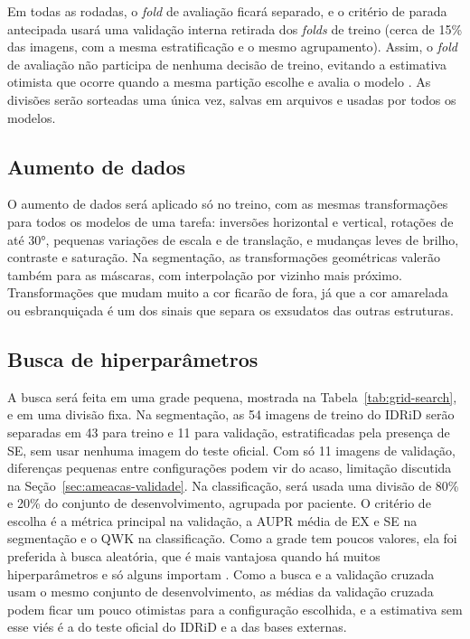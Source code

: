 Em todas as rodadas, o \textit{fold} de avaliação ficará separado, e o critério de parada antecipada usará uma validação interna retirada dos \textit{folds} de treino (cerca de 15\% das imagens, com a mesma estratificação e o mesmo agrupamento). Assim, o \textit{fold} de avaliação não participa de nenhuma decisão de treino, evitando a estimativa otimista que ocorre quando a mesma partição escolhe e avalia o modelo \cite{varma2006bias, cawley2010overfitting}. As divisões serão sorteadas uma única vez, salvas em arquivos e usadas por todos os modelos.

\subsection{Aumento de dados}
\label{sec:da-comum}

O aumento de dados será aplicado só no treino, com as mesmas transformações para todos os modelos de uma tarefa: inversões horizontal e vertical, rotações de até 30°, pequenas variações de escala e de translação, e mudanças leves de brilho, contraste e saturação. Na segmentação, as transformações geométricas valerão também para as máscaras, com interpolação por vizinho mais próximo. Transformações que mudam muito a cor ficarão de fora, já que a cor amarelada ou esbranquiçada é um dos sinais que separa os exsudatos das outras estruturas.

\subsection{Busca de hiperparâmetros}
\label{sec:busca-hiperparametros}

A busca será feita em uma grade pequena, mostrada na Tabela~\ref{tab:grid-search}, e em uma divisão fixa. Na segmentação, as 54 imagens de treino do IDRiD serão separadas em 43 para treino e 11 para validação, estratificadas pela presença de SE, sem usar nenhuma imagem do teste oficial. Com só 11 imagens de validação, diferenças pequenas entre configurações podem vir do acaso, limitação discutida na Seção~\ref{sec:ameacas-validade}. Na classificação, será usada uma divisão de 80\% e 20\% do conjunto de desenvolvimento, agrupada por paciente. O critério de escolha é a métrica principal na validação, a AUPR média de EX e SE na segmentação e o QWK na classificação. Como a grade tem poucos valores, ela foi preferida à busca aleatória, que é mais vantajosa quando há muitos hiperparâmetros e só alguns importam \cite{bergstra2012random}. Como a busca e a validação cruzada usam o mesmo conjunto de desenvolvimento, as médias da validação cruzada podem ficar um pouco otimistas para a configuração escolhida, e a estimativa sem esse viés é a do teste oficial do IDRiD e a das bases externas.

